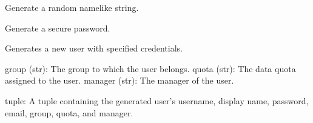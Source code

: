 \documentclass[letterpaper,10pt,english]{sphinxmanual}
\begin{document}

\begin{fulllineitems}
\label{\detokenize{utils:utils.user_management.generate_name}}
\pysigstartsignatures
{}
\pysigstopsignatures
\sphinxAtStartPar
Generate a random name\sphinxhyphen{}like string.

\end{fulllineitems}


\begin{fulllineitems}
\label{\detokenize{utils:utils.user_management.generate_password}}
\pysigstartsignatures
{}
\pysigstopsignatures
\sphinxAtStartPar
Generate a secure password.

\end{fulllineitems}


\begin{fulllineitems}
\label{\detokenize{utils:utils.user_management.generate_user}}
\pysigstartsignatures
{}
\pysigstopsignatures
\sphinxAtStartPar
Generates a new user with specified credentials.
\begin{description}
\sphinxAtStartPar
group (str): The group to which the user belongs.
quota (str): The data quota assigned to the user.
manager (str): The manager of the user.

\sphinxAtStartPar
tuple: A tuple containing the generated user’s username, display name, password, email, group, quota, and manager.

\end{description}

\end{fulllineitems}
\end{document}
